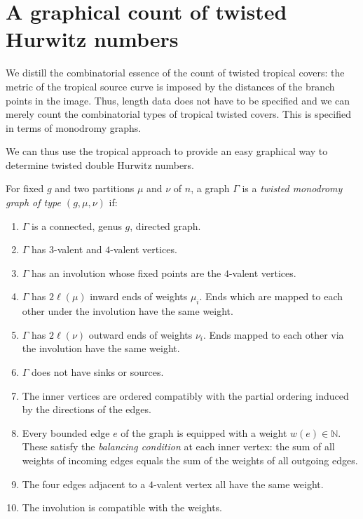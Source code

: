 \section{A graphical count of twisted Hurwitz numbers}
\label{sec:monodr}
We distill the combinatorial essence of the count of twisted tropical covers: the metric of the tropical source curve is imposed by the distances of the branch points in the image. Thus, length data does not have to be specified and we can merely count the combinatorial types of tropical twisted covers. This is specified in terms of monodromy graphs.

We can thus use the tropical approach to provide an easy graphical way to determine twisted double Hurwitz numbers.

\begin{defi}
\label{def-mongraph}
For fixed $g$ and two partitions $\mu$ and $\nu$ of $n$, a graph $\Gamma$ is a \emph{twisted monodromy graph of type $(g, \mu,\nu)$}  if:
\begin{enumerate}
\item $\Gamma$ is a connected, genus $g$, directed graph. 
\item $\Gamma$ has $3$-valent and $4$-valent vertices.
\item $\Gamma$ has an involution whose fixed points are the $4$-valent vertices.
\item $\Gamma$ has $2\ell(\mu)$ inward ends of weights $\mu_i$. Ends which are mapped to each other under the involution have the same weight.
\item $\Gamma$ has $2\ell(\nu)$ outward ends of weights $\nu_i$. Ends mapped to each other via the involution have the same weight.
\item $\Gamma$ does not have sinks or sources.
\item The inner vertices are ordered compatibly with the partial ordering induced by the directions of the edges.
\item Every bounded edge $e$ of the graph is equipped with a weight $w(e)\in \mathbb{N}$. These satisfy the \emph{balancing condition} at each inner vertex: the sum of all weights of  incoming  edges equals the sum of the weights of all outgoing edges.
\item The four edges adjacent to a $4$-valent vertex all have the same weight.
\item The involution is compatible with the weights.
\end{enumerate}
\end{defi}

